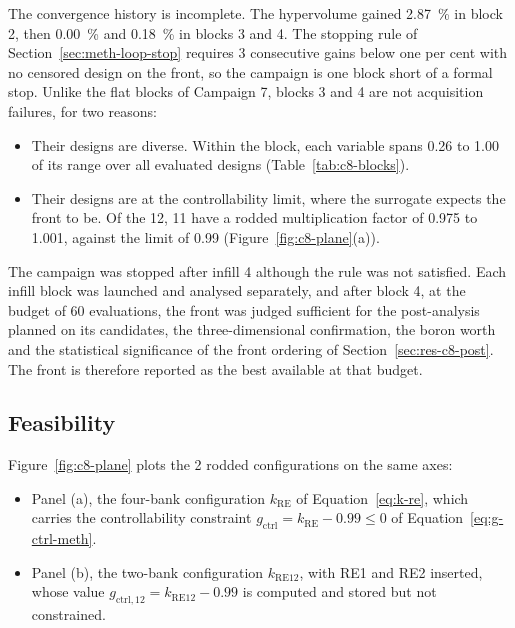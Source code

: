 The convergence history is incomplete. The hypervolume gained
\SI{2.87}{\%} in block 2, then \SI{0.00}{\%} and \SI{0.18}{\%} in
blocks 3 and 4. The stopping rule of Section~\ref{sec:meth-loop-stop}
requires 3 consecutive gains below one per cent with no censored design
on the front, so the campaign is one block short of a formal stop.
Unlike the flat blocks of Campaign 7, blocks 3 and 4 are not
acquisition failures, for two reasons:

\begin{itemize}
  \item Their designs are diverse. Within the block, each variable spans 0.26 to 1.00 of its range over all evaluated designs (Table~\ref{tab:c8-blocks}).

  \item Their designs are at the controllability limit, where the
        surrogate expects the front to be. Of the 12, 11 have a
        rodded multiplication factor of 0.975 to 1.001, against the limit of 0.99
        (Figure~\ref{fig:c8-plane}(a)).
\end{itemize}

The campaign was stopped after infill 4 although the rule was not
satisfied. Each infill block was launched and analysed separately, and
after block 4, at the budget of 60 evaluations, the front was judged
sufficient for the post-analysis planned on its candidates, the
three-dimensional confirmation, the boron worth and the statistical significance of the
front ordering of Section~\ref{sec:res-c8-post}. The front is therefore
reported as the best available at that budget.


\subsection{Feasibility}
\label{sec:res-c8-screens}

Figure~\ref{fig:c8-plane} plots the 2 rodded configurations on the same
axes:

\begin{itemize}
  \item Panel (a), the four-bank configuration $k_\mathrm{RE}$ of
        Equation~\eqref{eq:k-re}, which carries the controllability
        constraint $g_\mathrm{ctrl} = k_\mathrm{RE} - 0.99 \le 0$ of
        Equation~\eqref{eq:g-ctrl-meth}.

  \item Panel (b), the two-bank configuration $k_\mathrm{RE12}$, with RE1 and
        RE2 inserted, whose value
        $g_\mathrm{ctrl,12} = k_\mathrm{RE12} - 0.99$ is computed and
        stored but not constrained.
\end{itemize}

